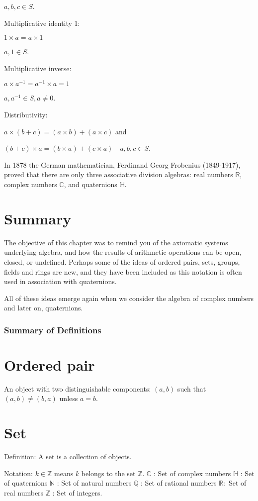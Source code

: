 $a, b, c \in S$.

Multiplicative identity 1:

$1 \times a=a \times 1$

$a, 1 \in S$.

Multiplicative inverse:

$a \times a^{-1}=a^{-1} \times a=1$

$a, a^{-1} \in S, a \neq 0$.

Distributivity:

$a \times(b+c)=(a \times b)+(a \times c)$ and

$(b+c) \times a=(b \times a)+(c \times a) \quad a, b, c \in S$.

In 1878 the German mathematician, Ferdinand Georg Frobenius (1849-1917), proved that there are only three associative division algebras: real numbers $\mathbb{R}$, complex numbers $\mathbb{C}$, and quaternions $\mathbb{H}$.

\section{Summary}
The objective of this chapter was to remind you of the axiomatic systems underlying algebra, and how the results of arithmetic operations can be open, closed, or undefined. Perhaps some of the ideas of ordered pairs, sets, groups, fields and rings are new, and they have been included as this notation is often used in association with quaternions.

All of these ideas emerge again when we consider the algebra of complex numbers and later on, quaternions.

\subsubsection{Summary of Definitions}
\section{Ordered pair}
An object with two distinguishable components: $(a, b)$ such that $(a, b) \neq(b, a)$ unless $a=b$.

\section{Set}
Definition: A set is a collection of objects.

Notation: $k \in \mathbb{Z}$ means $k$ belongs to the set $\mathbb{Z}$.
$\mathbb{C}$ : Set of complex numbers
$\mathbb{H}$ : Set of quaternions
$\mathbb{N}$ : Set of natural numbers
$\mathbb{Q}$ : Set of rational numbers
$\mathbb{R}:$ Set of real numbers
$\mathbb{Z}$ : Set of integers.

